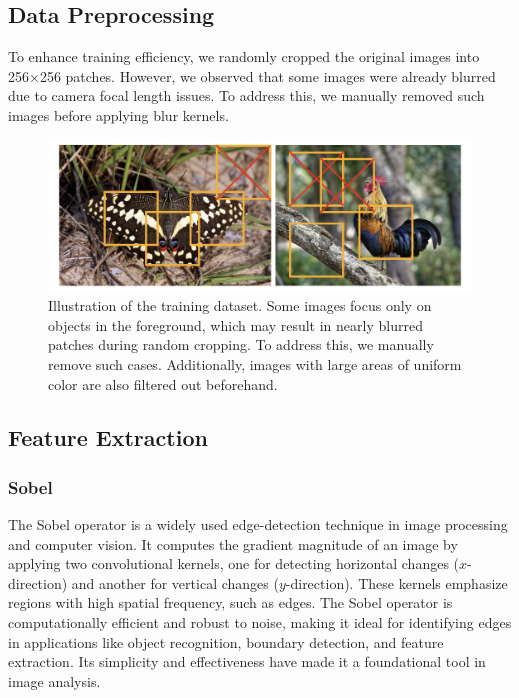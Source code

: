 \documentclass[twoside,11pt]{article}
\begin{document}
\subsection{Data Preprocessing}
To enhance training efficiency, we randomly cropped the original images into 256×256 patches. However, we observed that some images were already blurred due to camera focal length issues. To address this, we manually removed such images before applying blur kernels.

\begin{figure}[H]
\centering
\includegraphics[width=1\textwidth]{figure1.png}
\caption{Illustration of the training dataset. Some images focus only on objects in the foreground, which may result in nearly blurred patches during random cropping. To address this, we manually remove such cases. Additionally, images with large areas of uniform color are also filtered out beforehand.}
\end{figure}

\subsection{Feature Extraction}

\subsubsection{Sobel}
The Sobel operator is a widely used edge-detection technique in image processing and computer vision. It computes the gradient magnitude of an image by applying two convolutional kernels, one for detecting horizontal changes (\(x\)-direction) and another for vertical changes (\(y\)-direction). These kernels emphasize regions with high spatial frequency, such as edges. The Sobel operator is computationally efficient and robust to noise, making it ideal for identifying edges in applications like object recognition, boundary detection, and feature extraction. Its simplicity and effectiveness have made it a foundational tool in image analysis.
\end{document}
